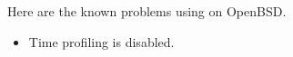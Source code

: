 
Here are the known problems using {\mlton} on OpenBSD.

\begin{itemize}

\item Time profiling is disabled.

\end{itemize}
